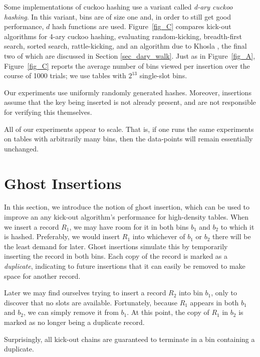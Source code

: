 \documentclass{sig-alternate-05-2015}
\begin{document}
Some implementations of cuckoo hashing use a variant called
\emph{d-ary cuckoo hashing}. In this variant, bins are of size one
and, in order to still get good performance, $d$ hash functions are
used. Figure~\ref{fig_C} compares kick-out algorithms for 4-ary cuckoo
hashing, evaluating random-kicking, breadth-first search, sorted
search, rattle-kicking, and an algorithm due to Khosla
\cite{khosla13}, the final two of which are discussed in Section
\ref{sec_dary_walk}.  Just as in Figure~\ref{fig_A},
Figure~\ref{fig_C} reports the average number of bins viewed per
insertion over the course of 1000 trials; we use tables with $2^{13}$
single-slot bins.

Our experiments use uniformly randomly generated hashes. Moreover,
insertions assume that the key being inserted is not already present,
and are not responsible for verifying this themselves.

All of our experiments appear to scale. That is, if one runs the same
experiments on tables with arbitrarily many bins, then the data-points
will remain essentially unchanged.



\section{Ghost Insertions}\label{secghost}

In this section, we introduce the notion of ghost insertion, which can
be used to improve an any kick-out algorithm's performance for
high-density tables. When we insert a record $R_1$, we may have room
for it in both bins $b_1$ and $b_2$ to which it is hashed. Preferably,
we would insert $R_1$ into whichever of $b_1$ or $b_2$ there will be
the least demand for later. Ghost insertions simulate this by
temporarily inserting the record in both bins. Each copy of the record
is marked as a \emph{duplicate}, indicating to future insertions that
it can easily be removed to make space for another record.
  


Later we may find ourselves trying to insert a record $R_2$ into bin
$b_1$, only to discover that no slots are available. Fortunately,
because $R_1$ appears in both $b_1$ and $b_2$, we can simply remove it
from $b_1$. At this point, the copy of $R_1$ in $b_2$ is marked as no
longer being a duplicate record.

Surprisingly, all kick-out chains are guaranteed to terminate in a bin
containing a duplicate.
\end{document}
